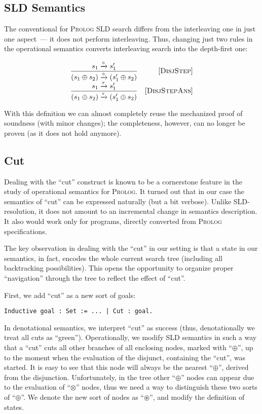 \subsection{SLD Semantics}

The conventional for \textsc{Prolog} SLD search differs from the interleaving one in just one aspect~--- it does not perform interleaving.
Thus, changing just two rules in the operational semantics converts interleaving search into the depth-first one:

\[
  \begin{array}{cr}
    \dfrac{s_1 \xrightarrow{\circ} s'_1}{(s_1 \oplus s_2) \xrightarrow{\circ} (s'_1 \oplus s_2)} &\mbox{[\textsc{DisjStep}]}\\
    \dfrac{s_1 \xrightarrow{r} s'_1}{(s_1 \oplus s_2) \xrightarrow{r} (s'_1 \oplus s_2)} &\mbox{[\textsc{DisjStepAns}]}
  \end{array}
\]

With this definition we can almost completely reuse the mechanized proof of soundness (with minor changes); the completeness, however,
can no longer be proven (as it does not hold anymore).

\subsection{Cut}

Dealing with the ``cut'' construct is known to be a cornerstone feature in the study of operational semantics for \textsc{Prolog}. It turned out that
in our case the semantics of ``cut'' can be expressed naturally (but a bit verbose). Unlike SLD-resolution, it does not amount to an incremental
change in semantics description. It also would work only for programs, directly converted from \textsc{Prolog} specifications.

The key observation in dealing with the ``cut'' in our setting is that a state in our semantics, in fact, encodes the whole current
search tree (including all backtracking possibilities). This opens the opportunity to organize proper ``navigation'' through the tree
to reflect the effect of ``cut''.

First, we add ``cut'' as a new sort of goals:

\begin{lstlisting}[language=Coq]
  Inductive goal : Set := ... | Cut : goal.
\end{lstlisting}

In denotational semantics, we interpret ``cut'' as success (thus, denotationally we treat all cuts as ``green''). Operationally, we
modify SLD semantics in such a way that a ``cut'' cuts all other branches of all enclosing nodes, marked with ``$\oplus$'', up to
the moment when the evaluation of the disjunct, containing the ``cut'', was started. It is easy to see that this node will always
be the nearest ``$\oplus$'', derived from the disjunction. Unfortunately, in the tree other ``$\oplus$'' nodes can
appear due to the evaluation of ``$\otimes$'' nodes, thus we need a way to distinguish these two sorts of ``$\oplus$''. We
denote the new sort of nodes as ``$\circledast$'', and modify the definition of states.

